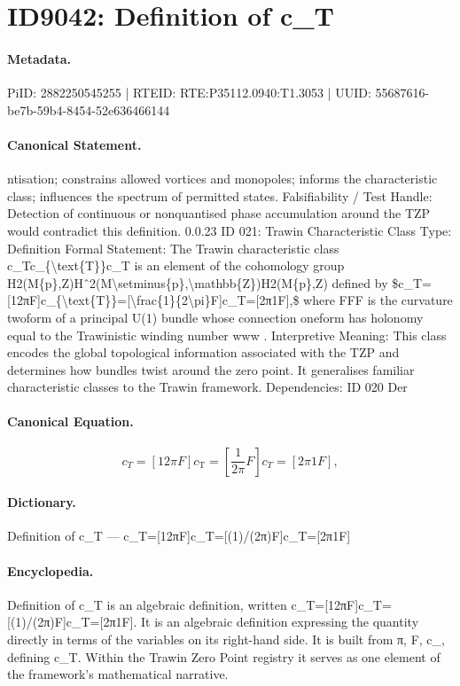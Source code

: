 \section*{ID9042: Definition of c\_T}
\paragraph{Metadata.}
PiID: 2882250545255 | RTEID: RTE:P35112.0940:T1.3053 | UUID: 55687616-be7b-59b4-8454-52e636466144

\paragraph{Canonical Statement.}
ntisation; constrains allowed vortices and monopoles; informs the characteristic class; influences the spectrum of permitted states. Falsifiability / Test Handle: Detection of continuous or nonquantised phase accumulation around the TZP would contradict this definition. 0.0.23 ID 021: Trawin Characteristic Class Type: Definition Formal Statement: The Trawin characteristic class c\_Tc\_\{\textbackslash{}text\{T\}\}c\_T is an element of the cohomology group H2(M\{p\},Z)Hˆ2(M\textbackslash{}setminus\{p\},\textbackslash{}mathbb\{Z\})H2(M\{p\},Z) defined by \$c\_T=[12πF]c\_\{\textbackslash{}text\{T\}\}=[\textbackslash{}frac\{1\}\{2\textbackslash{}pi\}F]c\_T=[2π1F],\$ where FFF is the curvature twoform of a principal U(1) bundle whose connection oneform has holonomy equal to the Trawinistic winding number www . Interpretive Meaning: This class encodes the global topological information associated with the TZP and determines how bundles twist around the zero point. It generalises familiar characteristic classes to the Trawin framework. Dependencies: ID 020 Der

\paragraph{Canonical Equation.}
\[
c_T=[12πF]c_{\text{T}}=[\frac{1}{2\pi}F]c_T=[2π1F],
\]

\paragraph{Dictionary.}
Definition of c\_T — c\_T=[12πF]c\_T=[(1)/(2π)F]c\_T=[2π1F]

\paragraph{Encyclopedia.}
Definition of c\_T is an algebraic definition, written c\_T=[12πF]c\_T=[(1)/(2π)F]c\_T=[2π1F]. It is an algebraic definition expressing the quantity directly in terms of the variables on its right-hand side. It is built from π, F, c\_, defining c\_T. Within the Trawin Zero Point registry it serves as one element of the framework's mathematical narrative.
